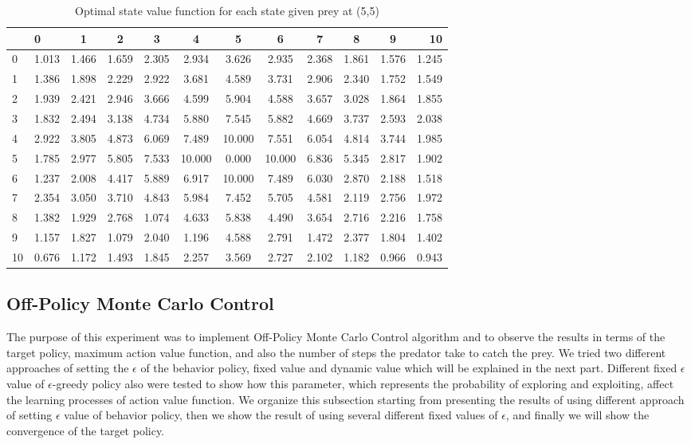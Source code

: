 \documentclass[paper=a4, fontsize=11pt]{scrartcl}
\numberwithin{equation}{section}		%
\numberwithin{figure}{section}			%
\numberwithin{table}{section}				%
\begin{document}
\begin{table}[H]
\caption{Optimal state value function for each state given prey at (5,5)}
\centering
\begin{tabular}{l|l*{9}{c}r}
  \hline
 & 0 & 1 & 2 & 3 & 4 & 5 & 6 & 7 & 8 & 9 & 10 \\ \hline 
0&1.013 & 1.466 & 1.659 & 2.305 & 2.934 & 3.626 & 2.935 & 2.368 & 1.861 & 1.576 & 1.245 \\
1&1.386 & 1.898 & 2.229 & 2.922 & 3.681 & 4.589 & 3.731 & 2.906 & 2.340 & 1.752 & 1.549 \\
2&1.939 & 2.421 & 2.946 & 3.666 & 4.599 & 5.904 & 4.588 & 3.657 & 3.028 & 1.864 & 1.855 \\
3&1.832 & 2.494 & 3.138 & 4.734 & 5.880 & 7.545 & 5.882 & 4.669 & 3.737 & 2.593 & 2.038 \\
4&2.922 & 3.805 & 4.873 & 6.069 & 7.489 & 10.000 & 7.551 & 6.054 & 4.814 & 3.744 & 1.985\\ 
5&1.785 & 2.977 & 5.805 & 7.533 & 10.000 & 0.000 & 10.000 & 6.836 & 5.345 & 2.817 & 1.902 \\ 
6&1.237 & 2.008 & 4.417 & 5.889 & 6.917 & 10.000 & 7.489 & 6.030 & 2.870 & 2.188 & 1.518 \\
7&2.354 & 3.050 & 3.710 & 4.843 & 5.984 & 7.452 & 5.705 & 4.581 & 2.119 & 2.756 & 1.972 \\
8&1.382 & 1.929 & 2.768 & 1.074 & 4.633 & 5.838 & 4.490 & 3.654 & 2.716 & 2.216 & 1.758 \\
9&1.157 & 1.827 & 1.079 & 2.040 & 1.196 & 4.588 & 2.791 & 1.472 & 2.377 & 1.804 & 1.402 \\
10&0.676 & 1.172 & 1.493 & 1.845 & 2.257 & 3.569 & 2.727 & 2.102 & 1.182 & 0.966 & 0.943 
\end{tabular}
\label{table:valueFunctionOn}
\end{table}


\subsection{Off-Policy Monte Carlo Control}
The purpose of this experiment was to implement Off-Policy Monte Carlo Control algorithm and to observe the results in terms of the target policy, maximum action value function, and also the number of steps the predator take to catch the prey. We tried two different approaches of setting the $\epsilon$ of the behavior policy, fixed value and dynamic value which will be explained in the next part. Different fixed $\epsilon$ value of $\epsilon$-greedy policy also were tested to show how this parameter, which represents the probability of exploring and exploiting, affect the learning processes of action value function. We organize this subsection starting from presenting the results of using different approach of setting $\epsilon$ value of behavior policy, then we show the result of using several different fixed values of $\epsilon$, and finally we will show the convergence of the target policy. 
\end{document}
